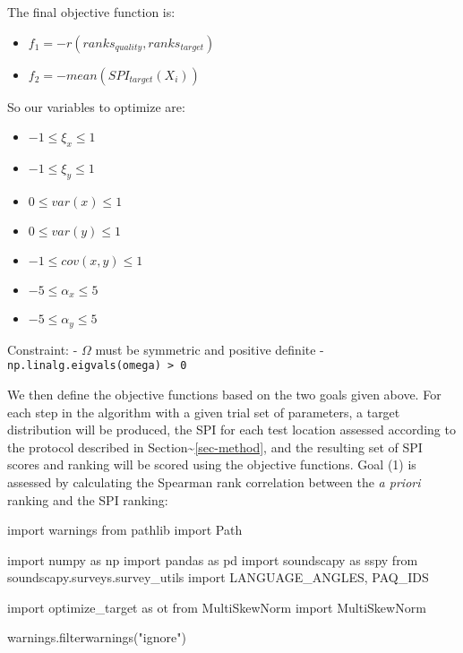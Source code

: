 \documentclass[
  authoryear,
  preprint,
  3p]{elsarticle}
\newenvironment{Shaded}{\begin{snugshade}}{\end{snugshade}}
\newcommand{\ImportTok}[1]{\textcolor[rgb]{0.00,0.46,0.62}{#1}}
\newcommand{\NormalTok}[1]{\textcolor[rgb]{0.00,0.23,0.31}{#1}}
\newcommand{\StringTok}[1]{\textcolor[rgb]{0.13,0.47,0.30}{#1}}
\providecommand{\tightlist}{%
  \setlength{\itemsep}{0pt}\setlength{\parskip}{0pt}}\usepackage{longtable,booktabs,array}
\begin{document}
The final objective function is:

\begin{itemize}
\tightlist
\item
  \(f_1 = -r(ranks_{quality}, ranks_{target})\)
\item
  \(f_2 = -mean(SPI_{target}(X_i))\)
\end{itemize}

So our variables to optimize are:

\begin{itemize}
\tightlist
\item
  \(-1 \leq \xi_x \leq 1\)
\item
  \(-1 \leq \xi_y \leq 1\)
\item
  \(0 \leq var(x) \leq 1\)
\item
  \(0 \leq var(y) \leq 1\)
\item
  \(-1 \leq cov(x, y) \leq 1\)
\item
  \(-5 \leq \alpha_x \leq 5\)
\item
  \(-5 \leq \alpha_y \leq 5\)
\end{itemize}

Constraint: - \(\Omega\) must be symmetric and positive definite -
\texttt{np.linalg.eigvals(omega)\ \textgreater{}\ 0}

We then define the objective functions based on the two goals given
above. For each step in the algorithm with a given trial set of
parameters, a target distribution will be produced, the SPI for each
test location assessed according to the protocol described in
Section\textasciitilde{}\ref{sec-method}, and the resulting set of SPI
scores and ranking will be scored using the objective functions. Goal
(1) is assessed by calculating the Spearman rank correlation between the
\emph{a priori} ranking and the SPI ranking:

\begin{Shaded}
\begin{Highlighting}[]
\ImportTok{import}\NormalTok{ warnings}
\ImportTok{from}\NormalTok{ pathlib }\ImportTok{import}\NormalTok{ Path}

\ImportTok{import}\NormalTok{ numpy }\ImportTok{as}\NormalTok{ np}
\ImportTok{import}\NormalTok{ pandas }\ImportTok{as}\NormalTok{ pd}
\ImportTok{import}\NormalTok{ soundscapy }\ImportTok{as}\NormalTok{ sspy}
\ImportTok{from}\NormalTok{ soundscapy.surveys.survey\_utils }\ImportTok{import}\NormalTok{ LANGUAGE\_ANGLES, PAQ\_IDS}

\ImportTok{import}\NormalTok{ optimize\_target }\ImportTok{as}\NormalTok{ ot}
\ImportTok{from}\NormalTok{ MultiSkewNorm }\ImportTok{import}\NormalTok{ MultiSkewNorm}

\NormalTok{warnings.filterwarnings(}\StringTok{"ignore"}\NormalTok{)}
\end{Highlighting}
\end{Shaded}
\end{document}
